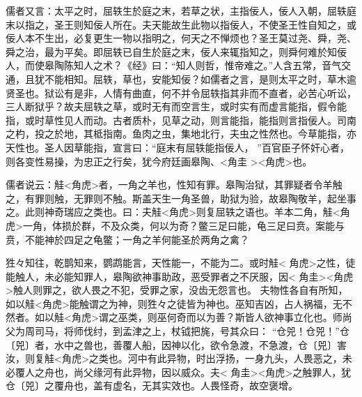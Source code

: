 \documentclass[]{article}
\begin{document}
儒者又言：太平之时，屈轶生於庭之末，若草之状，主指佞人，佞人入朝，屈轶庭末以指之，圣王则知佞人所在。夫天能故生此物以指佞人，不使圣王性自知之，或佞人本不生出，必复更生一物以指明之，何天之不惮烦也？圣王莫过尧、舜，尧、舜之治，最为平矣。即屈轶已自生於庭之末，佞人来辄指知之，则舜何难於知佞人，而使皋陶陈知人之术？《经》曰：``知人则哲，惟帝难之。''人含五常，音气交通，且犹不能相知。屈轶，草也，安能知佞？如儒者之言，是则太平之时，草木逾贤圣也。狱讼有是非，人情有曲直，何不并令屈轶指其非而不直者，必苦心听讼，三人断狱乎？故夫屈轶之草，或时无有而空言生，或时实有而虚言能指，假令能指，或时草性见人而动。古者质朴，见草之动，则言能指，能指则言指佞人。司南之杓，投之於地，其柢指南。鱼肉之虫，集地北行，夫虫之性然也。今草能指，亦天性也。圣人因草能指，宣言曰：``庭末有屈轶能指佞人，
''百官臣子怀奸心者，则各变性易操，为忠正之行矣，犹今府廷画皋陶、\textless{}角圭
\textgreater{}\textless{}角虎\textgreater{}也。

儒者说云：觟\textless{}角虎\textgreater{}者，一角之羊也，性知有罪。皋陶治狱，其罪疑者令羊触之，有罪则触，无罪则不触。斯盖天生一角圣兽，助狱为验，故皋陶敬羊，起坐事之。此则神奇瑞应之类也。曰：夫觟\textless{}角虎\textgreater{}则复屈轶之语也。羊本二角，觟\textless{}角虎\textgreater{}一角，体损於群，不及众类，何以为奇？鳖三足曰能，龟三足曰贲。案能与贲，不能神於四足之龟鳖；一角之羊何能圣於两角之禽？

狌々知往，乾鹊知来，鹦鹉能言，天性能一，不能为二。或时觟\textless{}
角虎\textgreater{}之性，徒能触人，未必能知罪人，皋陶欲神事助政，恶受罪者之不厌服，因\textless{}
角圭\textgreater{}\textless{}角虎\textgreater{}触人则罪之，欲人畏之不犯，受罪之家，没齿无怨言也。
夫物性各自有所知，如以觟\textless{}角虎\textgreater{}能触谓之为神，则狌々之徒皆为神也。巫知吉凶，占人祸福，无不然者。如以觟\textless{}角虎\textgreater{}谓之巫类，则巫何奇而以为善？斯皆人欲神事立化也。师尚父为周司马，将师伐纣，到孟津之上，杖钺把旄，号其众曰：
``仓兕！仓兕！''仓〔兕〕者，水中之兽也，善覆人船，因神以化，欲令急渡，不急渡，仓〔兕〕害汝，则复觟\textless{}角虎\textgreater{}之类也。河中有此异物，时出浮扬，一身九头，人畏恶之，未必覆人之舟也，尚父缘河有此异物，因以威众。夫\textless{}
角圭\textgreater{}\textless{}角虎\textgreater{}之触罪人，犹仓〔兕〕之覆舟也，盖有虚名，无其实效也。人畏怪奇，故空褒增。
\end{document}
